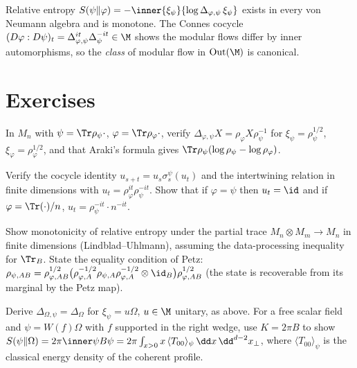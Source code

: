 \begin{keyidea}
Relative entropy $S(\psi\|\varphi)=-\inner{\xi_\psi}{\log\Delta_{\varphi,\psi}\,\xi_\psi}$ exists in every von Neumann algebra and is monotone. The Connes cocycle $(D\varphi:D\psi)_t=\Delta_{\varphi,\psi}^{it}\Delta_\psi^{-it}\in\M$ shows the modular flows differ by inner automorphisms, so the \emph{class} of modular flow in $\mathrm{Out}(\M)$ is canonical.
\end{keyidea}

\section*{Exercises}
\begin{exercise}
In $M_n$ with $\psi=\Tr\rho_\psi\cdot$, $\varphi=\Tr\rho_\varphi\cdot$, verify $\Delta_{\varphi,\psi}X=\rho_\varphi X\rho_\psi^{-1}$ for $\xi_\psi=\rho_\psi^{1/2}$, $\xi_\varphi=\rho_\varphi^{1/2}$, and that Araki's formula gives $\Tr\rho_\psi(\log\rho_\psi-\log\rho_\varphi)$.
\end{exercise}
\begin{exercise}
Verify the cocycle identity $u_{s+t}=u_s\sigma^\psi_s(u_t)$ and the intertwining relation in finite dimensions with $u_t=\rho_\varphi^{it}\rho_\psi^{-it}$. Show that if $\varphi=\psi$ then $u_t=\id$ and if $\varphi=\Tr(\cdot)/n$, $u_t=\rho_\psi^{-it}\cdot n^{-it}$.
\end{exercise}
\begin{exercise}
Show monotonicity of relative entropy under the partial trace $M_n\otimes M_m\to M_n$ in finite dimensions (Lindblad--Uhlmann), assuming the data-processing inequality for $\Tr_B$. State the equality condition of Petz: $\rho_{\psi,AB}=\rho_{\varphi,AB}^{1/2}\big(\rho_{\varphi,A}^{-1/2}\rho_{\psi,A}\rho_{\varphi,A}^{-1/2}\otimes\id_B\big)\rho_{\varphi,AB}^{1/2}$ (the state is recoverable from its marginal by the Petz map).
\end{exercise}
\begin{exercise}
Derive $\Delta_{\Omega,\psi}=\Delta_\Omega$ for $\xi_\psi=u\Omega$, $u\in\M$ unitary, as above. For a free scalar field and $\psi=W(f)\Omega$ with $f$ supported in the right wedge, use $K=2\pi B$ to show $S(\psi\|\Omega)=2\pi\inner\psi{B\psi}=2\pi\int_{x>0}x\,\langle T_{00}\rangle_\psi\,\dd x\,\dd^{d-2}x_\perp$, where $\langle T_{00}\rangle_\psi$ is the classical energy density of the coherent profile.
\end{exercise}
